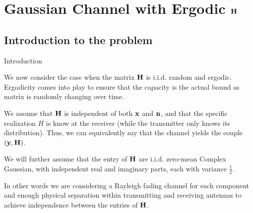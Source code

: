 \section{Gaussian Channel with Ergodic $\vb{H}$}
\subsection{Introduction to the problem}
\begin{frame}{Introduction}

We now consider the case when the matrix $\vb{H}$ is i.i.d. random and ergodic. Ergodicity comes into play to ensure that the capacity is the actual bound as matrix is randomly changing over time.

\medskip
We assume that $\vb{H}$ is independent of both $\vb{x}$ and $\vb{n}$, and that the specific realization $H$ is know at the receiver (while the transmitter only knows its distribution). Thus, we can equivalently say that the channel yields the couple $(\vb{y,H})$.

\medskip
We will further assume that the entry of $\vb{H}$ are i.i.d. zero-mean Complex Gaussian, with independent real and imaginary parts, each with variance $\frac{1}{2}$.

\medskip
In other words we are considering a Rayleigh fading channel for each component and enough physical separation within transmitting and receiving antennas to achieve independence between the entries of $\vb{H}$.

\end{frame}

